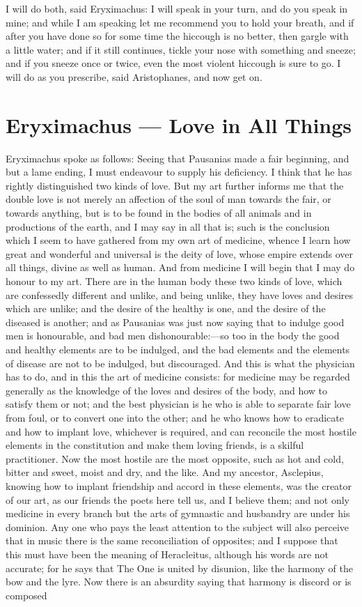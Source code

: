 \para[57] I will do both, said Eryximachus: I will speak in your turn, and do you speak in mine; and while I am speaking let me recommend you to hold your breath, and if after you have done so for some time the hiccough is no better, then gargle with a little water; and if it still continues, tickle your nose with something and sneeze; and if you sneeze once or twice, even the most violent hiccough is sure to go. I will do as you prescribe, said Aristophanes, and now get on.

\section*{Eryximachus — Love in All Things}

\para[58] Eryximachus spoke as follows: Seeing that Pausanias made a fair beginning, and but a lame ending, I must endeavour to supply his deficiency. I think that he has rightly distinguished two kinds of love. But my art further informs me that the double love is not merely an affection of the soul of man towards the fair, or towards anything, but is to be found in the bodies of all animals and in productions of the earth, and I may say in all that is; such is the conclusion which I seem to have gathered from my own art of medicine, whence I learn how great and wonderful and universal is the deity of love, whose empire extends over all things, divine as well as human. And from medicine I will begin that I may do honour to my art. There are in the human body these two kinds of love, which are confessedly different and unlike, and being unlike, they have loves and desires which are unlike; and the desire of the healthy is one, and the desire of the diseased is another; and as Pausanias was just now saying that to indulge good men is honourable, and bad men dishonourable:---so too in the body the good and healthy elements are to be indulged, and the bad elements and the elements of disease are not to be indulged, but discouraged. And this is what the physician has to do, and in this the art of medicine consists: for medicine may be regarded generally as the knowledge of the loves and desires of the body, and how to satisfy them or not; and the best physician is he who is able to separate fair love from foul, or to convert one into the other; and he who knows how to eradicate and how to implant love, whichever is required, and can reconcile the most hostile elements in the constitution and make them loving friends, is a skilful practitioner. Now the most hostile are the most opposite, such as hot and cold, bitter and sweet, moist and dry, and the like. And my ancestor, Asclepius, knowing how to implant friendship and accord in these elements, was the creator of our art, as our friends the poets here tell us, and I believe them; and not only medicine in every branch but the arts of gymnastic and husbandry are under his dominion. Any one who pays the least attention to the subject will also perceive that in music there is the same reconciliation of opposites; and I suppose that this must have been the meaning of Heracleitus, although his words are not accurate; for he says that The One is united by disunion, like the harmony of the bow and the lyre. Now there is an absurdity saying that harmony is discord or is composed 